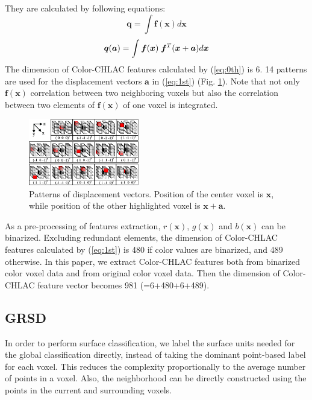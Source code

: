 \documentclass[conference]{sty/IEEEtran}
\begin{document}
They are calculated by following equations:  
\begin{equation}\label{eq:0th}
  {\bm q} = \int \bm{f}({\bm x}) d{\bm x} 
\end{equation}
\begin{equation}\label{eq:1st}
  {\bm q}({\bm a}) = \int \bm{f}({\bm x}) \hspace{1mm}\bm{f}^T({\bm x}+{\bm a}) d{\bm x} \\
\end{equation}
%
The dimension of Color-CHLAC features calculated by (\ref{eq:0th}) is 6. 
14 patterns are used for the displacement vectors ${\bm a}$ in (\ref{eq:1st}) (Fig. \ref{fig:displacement_vectors}). 
Note that not only $\bm{f}(\bm{x})$ correlation between two neighboring voxels 
    but also the correlation between two elements of $\bm{f}(\bm{x})$ of one voxel is integrated. 

\begin{figure}[htb!]
  \begin{center}
    \includegraphics[width=0.43\textwidth]{figures/colorCHLAC/displacement_vectors.png}
    \caption{Patterns of displacement vectors. Position of the center voxel is ${\bm x}$, 
      while position of the other highlighted voxel is ${\bm x}+{\bm a}$. }
    \label{fig:displacement_vectors}
  \end{center}
\end{figure}

As a pre-processing of features extraction, $r(\bm{x})$, $g(\bm{x})$ and $b(\bm{x})$ can be binarized. 
Excluding redundant elements, the dimension of Color-CHLAC features calculated by (\ref{eq:1st}) is 
    480 if color values are binarized, and 489 otherwise.
In this paper, we extract Color-CHLAC features both from binarized color voxel data and from original color voxel data. 
Then the dimension of Color-CHLAC feature vector becomes 981 (=6+480+6+489). 


\subsection{GRSD}
In order to perform surface classification, we label the surface units
needed for the global classification  directly, instead
of taking the dominant point-based label for each voxel. This reduces the
complexity proportionally to the average number of points in a voxel. Also,
the neighborhood can be directly constructed using the points in the current
and surrounding voxels.
\end{document}
